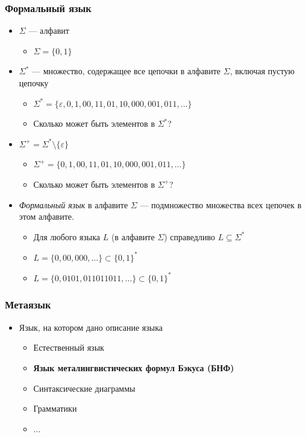\documentclass{beamer}
\begin{document}
\begin{frame}[fragile]
  \transwipe[direction=90]
  \frametitle{Формальный язык}
  \begin{itemize}
    \item $\Sigma$ --- алфавит
    \begin{itemize}
      \item $\Sigma = \{ 0, 1 \}$
    \end{itemize}
    \item $\Sigma^*$ --- множество, содержащее все цепочки в алфавите $\Sigma$, включая пустую цепочку
    \begin{itemize}
      \item $\Sigma^*=  \{ \varepsilon, 0, 1, 00, 11, 01, 10, 000, 001, 011, ... \}$
      \item Сколько может быть элементов в $\Sigma^*$?
      \pause
    \end{itemize}
    \item $\Sigma^+ = \Sigma^* \setminus \{ \varepsilon \} $ 
    \begin{itemize}
      \item $\Sigma^+ = \{0, 1, 00, 11, 01, 10, 000, 001, 011, \dots \}$
      \item Сколько может быть элементов в $\Sigma^+$?
      \pause
    \end{itemize}
  \end{itemize}
  \begin{itemize}
    \item \emph{Формальный язык} в алфавите $\Sigma$ --- подмножество множества всех цепочек в этом алфавите. 
    \begin{itemize} 
      \item Для любого языка $L$ (в алфавите $\Sigma$) справедливо $L \subseteq \Sigma^*$
      \item $L = \{ 0, 00, 000, \dots\} \subset \{0, 1\}^*$
      \item $L = \{ 0, 0101, 011011011, \dots\} \subset \{0, 1\}^*$
    \end{itemize}
  \end{itemize}
\end{frame}

\begin{frame}[fragile]
  \transwipe[direction=90]
  \frametitle{Метаязык}
  \begin{itemize}
    \item Язык, на котором дано описание языка
    \begin{itemize}
      \item Естественный язык
      \pause
      \item \textbf<5>{Язык металингвистических формул Бэкуса (БНФ)}
      \pause \item Синтаксические диаграммы
      \pause \item Грамматики 
      \item $\dots$
    \end{itemize}
  \end{itemize}
\end{frame}
\end{document}
